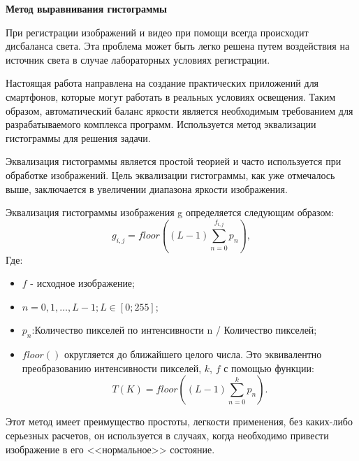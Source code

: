 \textbf{Метод выравнивания гистограммы}

При регистрации изображений и видео при помощи всегда происходит дисбаланса света. Эта проблема может быть легко решена путем воздействия на источник света в случае лабораторных условиях регистрации.

Настоящая работа направлена на создание практических приложений для смартфонов, которые могут работать в реальных условиях освещения. Таким образом, автоматический баланс яркости является необходимым требованием для разрабатываемого комплекса программ. Используется метод эквализации гистограммы для решения задачи.

Эквализация гистограммы является простой теорией и часто используется при обработке изображений. Цель эквализации гистограммы, как уже отмечалось выше, заключается в увеличении диапазона яркости изображения.

Эквализация гистограммы изображения g определяется следующим образом:
\begin{equation}\label{eq6}
g_{i,j}=floor\left(\left(L-1\right)\sum^{f_{i,j}}_{n=0}p_n\right),
\end{equation}
Где:

\begin{itemize}
	\item $f$ - исходное изображение;
	\item $n=0,1,…,L-1;L \in \left[0 ; 255\right]$;
	\item $p_n$:Количество пикселей по интенсивности  n / Количество пикселей;
	\item $floor()$ округляется до ближайшего целого числа. Это эквивалентно преобразованию интенсивности пикселей, $k$, $f$ с помощью функции:
	\begin{equation}\label{eq7}
T\left(K\right)=floor\left(\left(L-1\right)\sum^k_{n=0}p_n\right).
\end{equation}
\end{itemize}
Этот метод имеет преимущество простоты, легкости применения, без каких-либо серьезных расчетов, он используется в случаях, когда необходимо привести изображение в его <<нормальное>> состояние.
